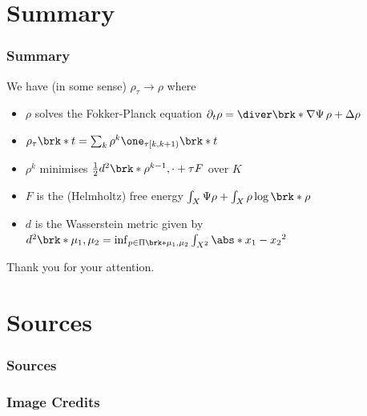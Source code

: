\section{Summary}

\begin{frame}
  \frametitle{Summary}
  We have (in some sense) $\rho_\tau\to \rho$ where
  \begin{itemize}
    \item $\rho$ solves the Fokker-Planck equation $\partial_t\rho=\diver\brk*{\nabla\Psi\,\rho}+\Delta\rho$
    \item $\rho_\tau\brk*{t}=\sum_k\rho^k\one_{\tau[k,k+1)}\brk*{t}$
    \item $\rho^{k}$ minimises $\frac{1}{2}d^2\brk*{\rho^{k-1},\cdot}+\tau F$ over $K$
    \item $F$ is the (Helmholtz) free energy $\int_X\Psi\rho+\int_X\rho\log\brk*{\rho}$
    \item $d$ is the Wasserstein metric given by $d^2\brk*{\mu_1,\mu_2}=\inf_{p\in\Pi\brk*{\mu_1,\mu_2}}\int_{X^2}\abs*{x_1-x_2}^2$
  \end{itemize}
\end{frame}

\begin{frame}[plain]
	\begin{center}
		\Large{{Thank you for your attention.}}
	\end{center}
\end{frame}

\section{Sources}

\begin{frame}[allowframebreaks]
	\frametitle{Sources}
	\nocite{*}
  
	\printbibliography[notcategory=image]
\end{frame}

\begin{frame}[allowframebreaks]
  \frametitle{Image Credits}
  \printbibliography[category=image]
\end{frame}




